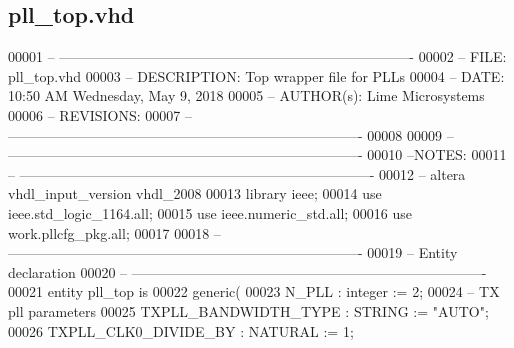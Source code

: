 \subsection{pll\+\_\+top.\+vhd}
\label{pll__top_8vhd_source}

\begin{DoxyCode}
00001 \textcolor{keyword}{-- ----------------------------------------------------------------------------}
00002 \textcolor{keyword}{-- FILE:          pll\_top.vhd}
00003 \textcolor{keyword}{-- DESCRIPTION:   Top wrapper file for PLLs}
00004 \textcolor{keyword}{-- DATE:          10:50 AM Wednesday, May 9, 2018}
00005 \textcolor{keyword}{-- AUTHOR(s):     Lime Microsystems}
00006 \textcolor{keyword}{-- REVISIONS:}
00007 \textcolor{keyword}{-- ----------------------------------------------------------------------------}
00008 
00009 \textcolor{keyword}{-- ----------------------------------------------------------------------------}
00010 \textcolor{keyword}{--NOTES:}
00011 \textcolor{keyword}{-- ----------------------------------------------------------------------------}
00012 \textcolor{keyword}{-- altera vhdl\_input\_version vhdl\_2008}
00013 \textcolor{vhdlkeyword}{library }\textcolor{keywordflow}{ieee};
00014 \textcolor{vhdlkeyword}{use }ieee.std\_logic\_1164.\textcolor{keywordflow}{all};
00015 \textcolor{vhdlkeyword}{use }ieee.numeric\_std.\textcolor{keywordflow}{all};
00016 \textcolor{vhdlkeyword}{use }work.pllcfg_pkg.\textcolor{keywordflow}{all};
00017 
00018 \textcolor{keyword}{-- ----------------------------------------------------------------------------}
00019 \textcolor{keyword}{-- Entity declaration}
00020 \textcolor{keyword}{-- ----------------------------------------------------------------------------}
00021 \textcolor{keywordflow}{entity }pll_top \textcolor{keywordflow}{is}
00022    \textcolor{keywordflow}{generic}\textcolor{vhdlchar}{(}
00023       \textcolor{vhdlchar}{N_PLL}                         \textcolor{vhdlchar}{:} \textcolor{comment}{integer}   \textcolor{vhdlchar}{:=} \textcolor{vhdllogic}{}\textcolor{vhdllogic}{2};
00024 \textcolor{keyword}{      -- TX pll parameters}
00025       \textcolor{vhdlchar}{TXPLL_BANDWIDTH_TYPE}          \textcolor{vhdlchar}{:} \textcolor{comment}{STRING}    \textcolor{vhdlchar}{:=} \textcolor{keyword}{"AUTO"};
00026       \textcolor{vhdlchar}{TXPLL_CLK0_DIVIDE_BY}          \textcolor{vhdlchar}{:} \textcolor{comment}{NATURAL}   \textcolor{vhdlchar}{:=} \textcolor{vhdllogic}{}\textcolor{vhdllogic}{1};

\end{DoxyCode}
